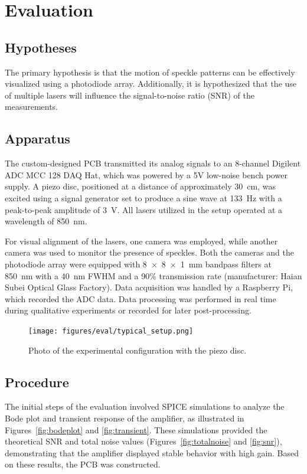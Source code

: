 \section{Evaluation}
\label{sec:evaluation}

\subsection{Hypotheses}
The primary hypothesis is that the motion of speckle patterns can be effectively visualized using a photodiode array. 
Additionally, it is hypothesized that the use of multiple lasers will influence the signal-to-noise ratio (SNR) of the measurements.

\subsection{Apparatus}

The custom-designed PCB transmitted its analog signals to an 8-channel Digilent ADC MCC 128 DAQ Hat, which was powered by a 5V low-noise bench power supply. 
A piezo disc, positioned at a distance of approximately 30~cm, was excited using a signal generator set to produce a sine wave at 133~Hz with a peak-to-peak amplitude of 3~V. 
All lasers utilized in the setup operated at a wavelength of 850~nm.

For visual alignment of the lasers, one camera was employed, while another camera was used to monitor the presence of speckles. 
Both the cameras and the photodiode array were equipped with 8~$\times$~8~$\times$~1~mm bandpass filters at 850~nm with a 40~nm FWHM and a 90\% transmission rate (manufacturer: Haian Subei Optical Glass Factory).
Data acquisition was handled by a Raspberry Pi, which recorded the ADC data. 
Data processing was performed in real time during qualitative experiments or recorded for later post-processing.

\begin{figure}[t]
\centering
\texttt{[image: figures/eval/typical\_setup.png]}
\caption{Photo of the experimental configuration with the piezo disc.}
\label{fig:setup}
\end{figure}

\subsection{Procedure}

The initial steps of the evaluation involved SPICE simulations to analyze the Bode plot and transient response of the amplifier, as illustrated in Figures~\ref{fig:bodeplot} and \ref{fig:transient}. 
These simulations provided the theoretical SNR and total noise values (Figures~\ref{fig:totalnoise} and \ref{fig:snr}), demonstrating that the amplifier displayed stable behavior with high gain. 
Based on these results, the PCB was constructed.


